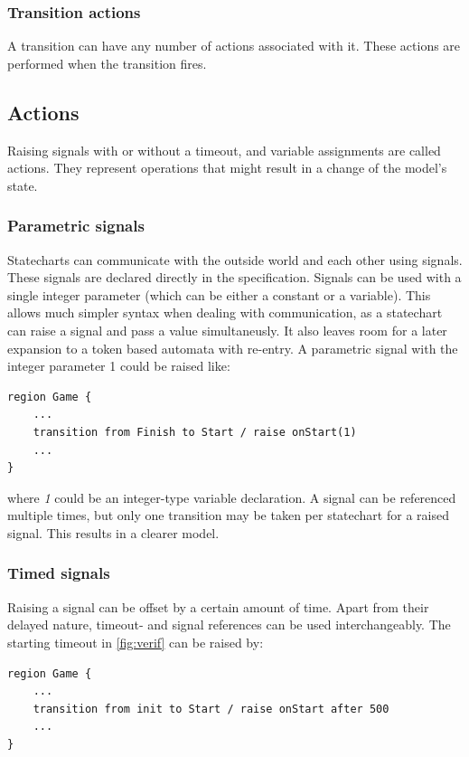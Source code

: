     \subsubsection{Transition actions}
A transition can have any number of actions associated with it. These actions are performed when the transition fires.

  \subsection{Actions}
Raising signals with or without a timeout, and variable assignments are called actions. They represent operations that might result in a change of the model's state.
  \subsubsection{Parametric signals}
Statecharts can communicate with the outside world and each other using signals. These signals are declared directly in the specification. Signals can be used with a single integer parameter (which can be either a constant or a variable). This allows much simpler syntax when dealing with communication, as a statechart can raise a signal and pass a value simultaneusly. It also leaves room for a later expansion to a token based automata with re-entry.
A parametric signal with the integer parameter 1 could be raised like:

\begin{lstlisting}
region Game {
	...
	transition from Finish to Start / raise onStart(1)
	...
}
\end{lstlisting}

where \textit{1} could be an integer-type variable declaration. A signal can be referenced multiple times, but only one transition may be taken per statechart for a raised signal. This results in a clearer model.
  \subsubsection{Timed signals}
Raising a signal can be offset by a certain amount of time. Apart from their delayed nature, timeout- and signal references can be used interchangeably. The starting timeout in \cref{fig:verif} can be raised by:

\begin{lstlisting}
region Game {
	...
	transition from init to Start / raise onStart after 500
	...
}
\end{lstlisting}

